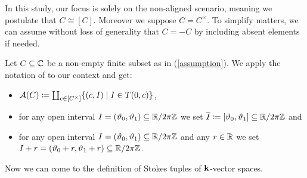 \begin{ass}\label{assumption} In this study, our focus is solely on the non-aligned scenario, meaning we postulate that $C \cong [C]$. Moreover we suppose $C = C^\times$. To simplify matters, we can assume  without loss of generality that $C = -C$ by including absent elements if needed.
\end{ass}


\begin{nota}\label{MochiNotation} Let $C \subseteq \mathbb{C}$ be a non-empty finite subset as in (\ref{assumption}).
    We apply the notation of \cite{mochistokes} to our context and get:
\begin{itemize}
    \item $\mathcal{A}(C) \coloneqq \coprod_{c \in [C^\times]} \{(c, I) \mid I \in T(0,c)\}$,
    \item for any open interval $I=(\vartheta_0,\vartheta_1) \subseteq \mathbb{R}/2\pi\mathbb{Z}$ we set $\overline{I}\coloneqq [\vartheta_0,\vartheta_1] \subseteq \mathbb{R}/2\pi\mathbb{Z}$ and  
    \item for any open interval $I =(\vartheta_0, \vartheta_1) \subseteq \mathbb{R}/2\pi\mathbb{Z}$ and any $r \in \mathbb{R}$ we set $I+r=(\vartheta_0+r, \vartheta_1+r)\subseteq \mathbb{R}/2\pi\mathbb{Z}$.
    \end{itemize}


\begin{comment}
    \item \textcolor{gray}{Moreover we set $\theta^I_\ell \coloneqq \theta_0$, $\theta^I_r \coloneqq \theta_1$ and $\theta^I_m \coloneqq \frac{\theta_1-\theta_0}{2}$}.
    \item \textcolor{gray}{for $I_1, I_2 \in T(C)$ we write $I_1 \vdash I_2$ if $\theta_\ell^{I_1} < \theta_\ell^{I_2}$ and $(\theta_\ell^{I_1}, \theta_\ell^{I_2}) \cap S_0(C) = \varnothing$} \textcolor{red}{Falls wir das brauchen muss "<" noch besser spezifiziert werden (als Relation in $\R/2\pi\Z$).}
\end{comment}


\end{nota}

Now we can come to the definition of Stokes tuples of $\mathbf{k}$-vector spaces.

